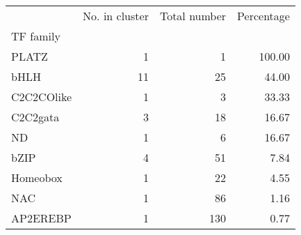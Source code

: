 \begin{tabular}{lrrr}
\toprule
{} &  No. in cluster &  Total number &  Percentage \\
TF family  &                 &               &             \\
\midrule
PLATZ      &               1 &             1 &      100.00 \\
bHLH       &              11 &            25 &       44.00 \\
C2C2COlike &               1 &             3 &       33.33 \\
C2C2gata   &               3 &            18 &       16.67 \\
ND         &               1 &             6 &       16.67 \\
bZIP       &               4 &            51 &        7.84 \\
Homeobox   &               1 &            22 &        4.55 \\
NAC        &               1 &            86 &        1.16 \\
AP2EREBP   &               1 &           130 &        0.77 \\
\bottomrule
\end{tabular}
